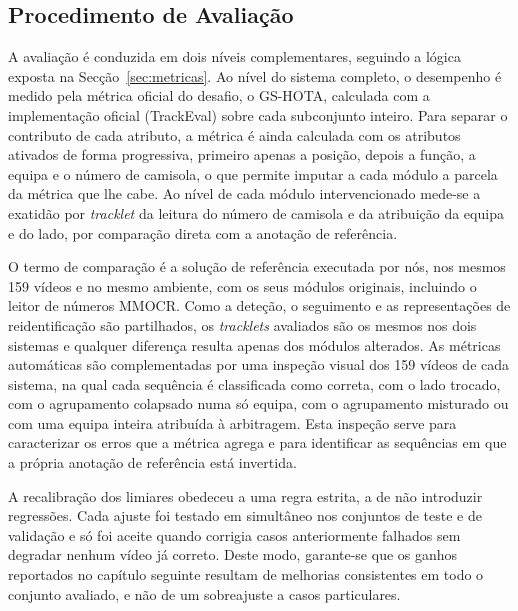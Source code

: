 \subsection{Procedimento de Avaliação}\label{sec:protocolo}

A avaliação é conduzida em dois níveis complementares, seguindo a lógica exposta na Secção~\ref{sec:metricas}. Ao nível do sistema completo, o desempenho é medido pela métrica oficial do desafio, o GS-HOTA, calculada com a implementação oficial (TrackEval) sobre cada subconjunto inteiro. Para separar o contributo de cada atributo, a métrica é ainda calculada com os atributos ativados de forma progressiva, primeiro apenas a posição, depois a função, a equipa e o número de camisola, o que permite imputar a cada módulo a parcela da métrica que lhe cabe. Ao nível de cada módulo intervencionado mede-se a exatidão por \emph{tracklet} da leitura do número de camisola e da atribuição da equipa e do lado, por comparação direta com a anotação de referência.

O termo de comparação é a solução de referência executada por nós, nos mesmos 159 vídeos e no mesmo ambiente, com os seus módulos originais, incluindo o leitor de números MMOCR. Como a deteção, o seguimento e as representações de reidentificação são partilhados, os \emph{tracklets} avaliados são os mesmos nos dois sistemas e qualquer diferença resulta apenas dos módulos alterados. As métricas automáticas são complementadas por uma inspeção visual dos 159 vídeos de cada sistema, na qual cada sequência é classificada como correta, com o lado trocado, com o agrupamento colapsado numa só equipa, com o agrupamento misturado ou com uma equipa inteira atribuída à arbitragem. Esta inspeção serve para caracterizar os erros que a métrica agrega e para identificar as sequências em que a própria anotação de referência está invertida.

A recalibração dos limiares obedeceu a uma regra estrita, a de não introduzir regressões. Cada ajuste foi testado em simultâneo nos conjuntos de teste e de validação e só foi aceite quando corrigia casos anteriormente falhados sem degradar nenhum vídeo já correto. Deste modo, garante-se que os ganhos reportados no capítulo seguinte resultam de melhorias consistentes em todo o conjunto avaliado, e não de um sobreajuste a casos particulares.
